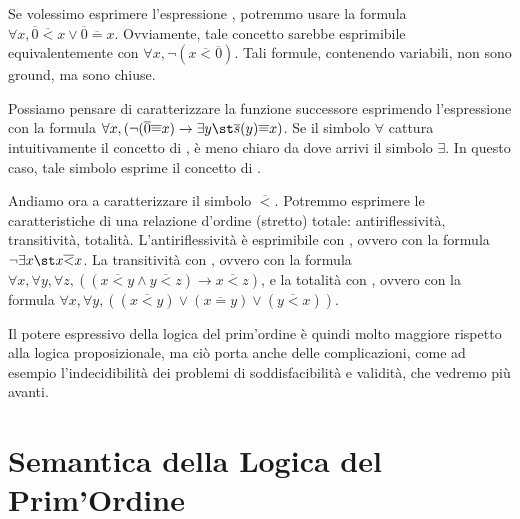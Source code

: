 Se volessimo esprimere l'espressione , potremmo usare la formula \(\forall x, \overline{0} \overline{<} x \lor \overline{0}\overline{=}x\). Ovviamente, tale concetto sarebbe esprimibile equivalentemente con \(\forall x, \neg(x\overline{<}\overline{0})\). Tali formule, contenendo variabili, non sono ground, ma sono chiuse.

Possiamo pensare di caratterizzare la funzione successore esprimendo l'espressione  con la formula \(\forall x, (\neg(\overline{0}\overline{=}x)\to\exists y\st \overline{s}(y)\overline{=}x)\). Se il simbolo \(\forall\) cattura intuitivamente il concetto di , è meno chiaro da dove arrivi il simbolo \(\exists\). In questo caso, tale simbolo esprime il concetto di . 

Andiamo ora a caratterizzare il simbolo \(\overline{<}\). Potremmo esprimere le caratteristiche di una relazione d'ordine (stretto) totale: antiriflessività, transitività, totalità. L'antiriflessività è esprimibile con , ovvero con la formula \(\neg \exists x\st x \overline{<} x\). La transitività con , ovvero con la formula \(\forall x, \forall y, \forall z, \left((x \overline{<} y \land y \overline{<} z)\to x \overline{<} z\right)\), e la totalità con , ovvero con la formula \(\forall x, \forall y, ((x \overline{<} y)\lor(x\overline{=}y)\lor(y\overline{<} x))\).

Il potere espressivo della logica del prim'ordine è quindi molto maggiore rispetto alla logica proposizionale, ma ciò porta anche delle complicazioni, come ad esempio l'indecidibilità dei problemi di soddisfacibilità e validità, che vedremo più avanti.

\section{Semantica della Logica del Prim'Ordine}

